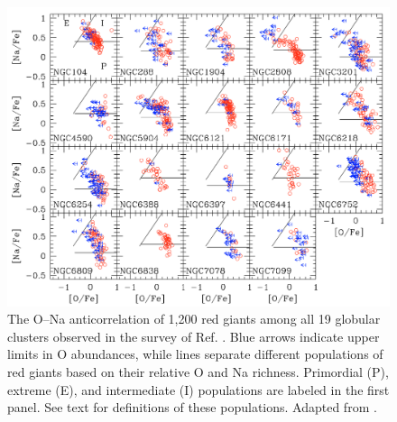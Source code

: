 \begin{figure}[t]
\centering
\includegraphics[width=6.5in]{Chapter-6/figs/O-Na.png}
\caption{\label{fig:O-Na}The O--Na anticorrelation of 1,200 red giants among all 19 globular clusters observed in the survey of Ref. \cite{Carretta2010}. Blue arrows indicate upper limits in O abundances, while lines separate different populations of red giants based on their relative O and Na richness. Primordial (P), extreme (E), and intermediate (I) populations are labeled in the first panel. See text for definitions of these populations. Adapted from \cite{Carretta2010}.}
\end{figure}




